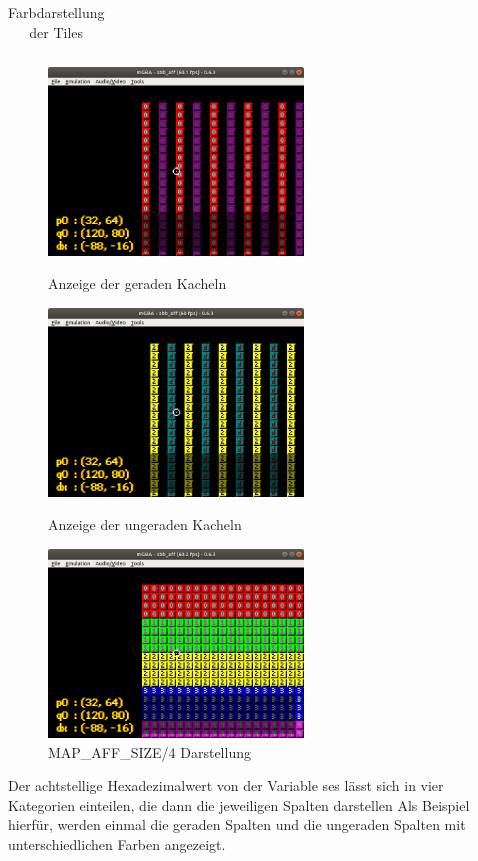 \begin{table}[h]
{\begin{tabular}{|l|l|l|l|l|l|l|l|l|}
\end{tabular}%
}
\caption{Farbdarstellung der Tiles}
\label{tilesfarbe}
\end{table}

\begin{figure}
	\includegraphics[height=50mm]{img/gerade.png}
	\caption{Anzeige der geraden Kacheln}
	\includegraphics[height=50mm]{img/ungerade.png}
	\caption{Anzeige der ungeraden Kacheln}
	\includegraphics[height=50mm]{img/mapaffsize.png}
	\caption{MAP\_AFF\_SIZE/4 Darstellung}
\end{figure}
Der achtstellige Hexadezimalwert von der Variable ses lässt sich in vier Kategorien einteilen, die dann die jeweiligen Spalten darstellen
Als Beispiel hierfür, werden einmal die geraden Spalten und die ungeraden Spalten mit unterschiedlichen Farben angezeigt. 
